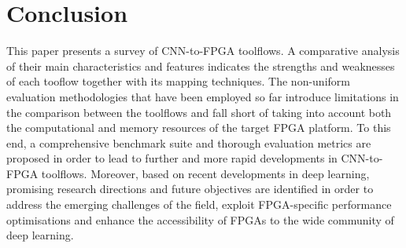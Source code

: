 \documentclass[format=acmsmall, review=false, screen=true]{acmart}
\begin{document}
\section{Conclusion}

This paper presents a survey of CNN-to-FPGA toolflows. A comparative analysis of their main characteristics and features indicates the strengths and weaknesses of each tooflow together with its mapping techniques. The non-uniform evaluation methodologies that have been employed so far introduce limitations in the comparison between the toolflows and fall short of taking into account both the computational and memory resources of the target FPGA platform. To this end, a comprehensive benchmark suite and thorough evaluation metrics are proposed in order to lead to further and more rapid developments in CNN-to-FPGA toolflows. Moreover, based on recent developments in deep learning, promising research directions and future objectives are identified in order to address the emerging challenges of the field, exploit FPGA-specific performance optimisations and enhance the accessibility of FPGAs to the wide community of deep learning. 




\begin{comment}
\section*{Acknowledgement}
The support of the EPSRC Centre for Doctoral Training in High Performance Embedded and Distributed Systems  (HiPEDS, Grant Reference EP/L016796/1) is gratefully acknowledged.
\end{comment}







\end{document}
